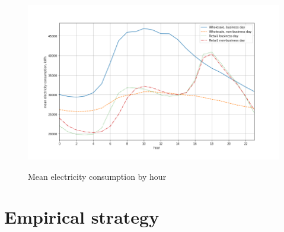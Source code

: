 \begin{frame}
\begin{figure}[H]
  \centering
  \caption{Mean electricity consumption by hour}
    \includegraphics[width=1. \textwidth]{graphics/hours}
  \label{fig:cons_hour}
\end{figure}
\end{frame}


\section{Empirical strategy}


